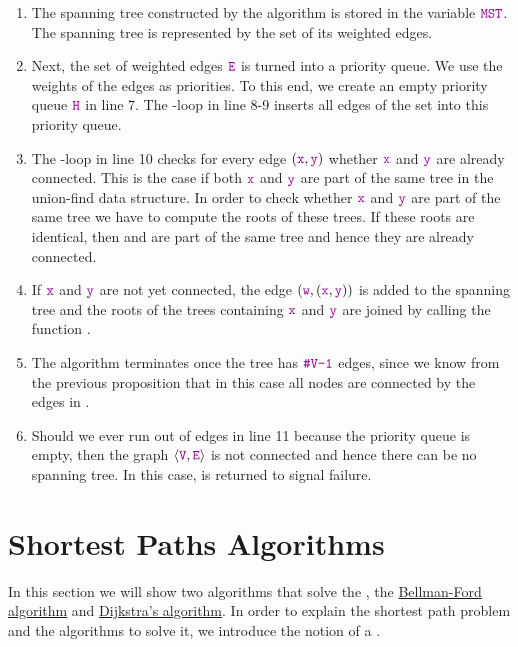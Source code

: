 \begin{enumerate}
\item The spanning tree constructed by the algorithm is stored in the variable $\mytt{MST}$.
      The spanning tree is represented by the set of its weighted edges.  
\item Next, the set of weighted edges $\mytt{E}$ is turned into a priority queue.
      We use the weights of the edges as priorities. 
      To this end, we create an empty priority queue $\mytt{H}$ in line 7.
      The -loop in line 8-9 inserts all edges of the set  into this priority queue.
\item The -loop in line 10 checks for every edge $(\mytt{x},\mytt{y})$  whether $\mytt{x}$ and $\mytt{y}$ are already
      connected.  This is the case if both $\mytt{x}$ and $\mytt{y}$ are part of the same tree
      in the union-find data structure.  In order to
      check whether $\mytt{x}$ and $\mytt{y}$ are part of the same tree
      we have to compute the roots of these trees. 
      If these roots are identical, then  and  are part of the same tree and hence
      they are already connected. 
\item If $\mytt{x}$ and $\mytt{y}$ are not yet connected, the  edge $(\mytt{w}, (\mytt{x}, \mytt{y}))$ is added to the
      spanning tree and the roots of the trees containing $\mytt{x}$ and $\mytt{y}$ are joined by calling the function
      .
\item The algorithm terminates once the tree  has $\mytt{\#V-1}$ edges, since we know from the previous
      proposition that in this case all nodes are connected by the edges in .
\item Should we ever run out of edges in line 11 because the priority queue  is empty, then the graph
      $\langle \mytt{V}, \mytt{E} \rangle$ is not connected and hence there can be no spanning tree.
      In this case,   is returned to signal failure.
\end{enumerate}


\section{Shortest Paths Algorithms}
In this section we will show two algorithms that solve the
\href{https://en.wikipedia.org/wiki/Shortest_path_problem}{}, the 
\href{https://en.wikipedia.org/wiki/Bellman-Ford_algorithm}{Bellman-Ford algorithm} and
\href{https://en.wikipedia.org/wiki/Dijkstra%27s_algorithm}{Dijkstra's algorithm}.  
In order to explain the shortest path problem and the algorithms to solve it, we introduce the notion
of a \href{https://en.wikipedia.org/wiki/Directed_graph}{}.


